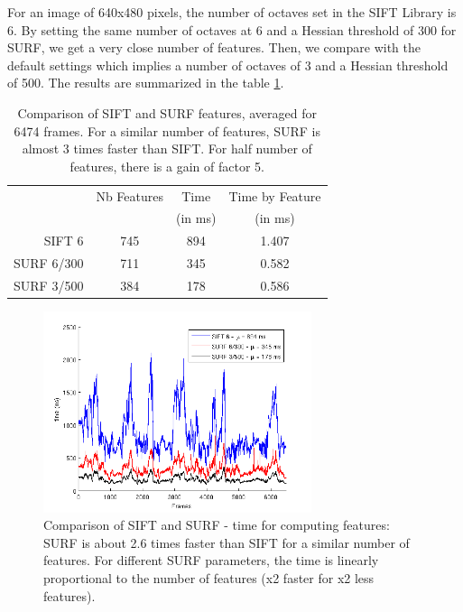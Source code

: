 For an image of 640x480 pixels, the number of octaves set in the SIFT Library is 6. By setting the same number of octaves at 6 and a Hessian threshold of 300 for \gls{SURF}, we get a very close number of features. Then, we compare with the default settings which implies a number of octaves of 3 and a Hessian threshold of 500. The results are summarized in the table \ref{tab:stats_features}.

\begin{table}[h]
 \begin{center}
 \begin{tabular}{r|ccc}
 & Nb Features & Time & Time by Feature \\
 &  & (in ms) & (in ms) \\
 \hline
 SIFT 6 & 745 & 894 & 1.407\\
 SURF 6/300 & 711  & 345  & 0.582 \\
 SURF 3/500 & 384 & 178 & 0.586 \\
 \end{tabular}
\caption{Comparison of SIFT and SURF features, averaged for 6474 frames. For a similar number of features, SURF is almost 3 times faster than SIFT. For half number of features, there is a gain of factor 5.}
\label{tab:stats_features}
\end{center}
\end{table}

\clearpage

\begin{figure}[H]
\begin{center}
\includegraphics[width=0.7\textwidth]{figures/stats_features_time}
\caption{Comparison of SIFT and SURF - time for computing features: SURF is about 2.6 times faster than SIFT for a similar number of features. For different SURF parameters, the time is linearly proportional to the number of features (x2 faster for x2 less features).}
\end{center}
\end{figure}

